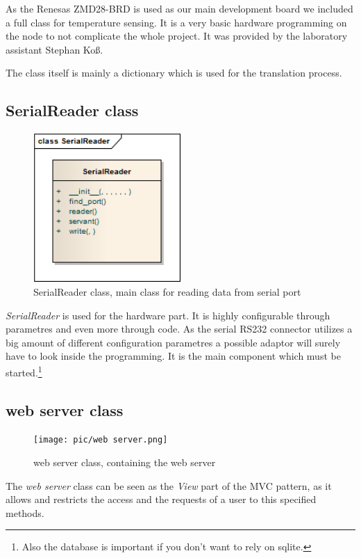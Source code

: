 As the Renesas ZMD28-BRD is used as our main development board we included a full class for temperature sensing. It is a very 
basic hardware programming on the node to not complicate the whole project. It was provided by the laboratory assistant Stephan Ko\ss.

The class itself is mainly a dictionary which is used for the translation process.

\newpage
\subsection{SerialReader class}
\begin{figure}[H]
   \centering
   \includegraphics[width=0.5\textwidth]{pic/SerialReader.png}%
   \caption{SerialReader class, main class for reading data from serial port}
   \label{SerialReaderpic}%
\end{figure}

\textit{SerialReader} is used for the hardware part. It is highly configurable through parametres and even more through code. As the
serial RS232 connector utilizes a big amount of different configuration parametres a possible adaptor will surely have to look inside the
programming. It is the main component which must be started.\footnote{Also the database is important if you don't want to rely on sqlite.}

\newpage
\subsection{web server class}
\begin{figure}[H]
   \centering
   \texttt{[image: pic/web server.png]}%
   \caption{web server class, containing the web server}
   \label{web serverpic}%
\end{figure}

The \textit{web server} class can be seen as the \textit{View} part of the MVC pattern, as it allows and restricts the access and the requests of a user to this specified methods.


